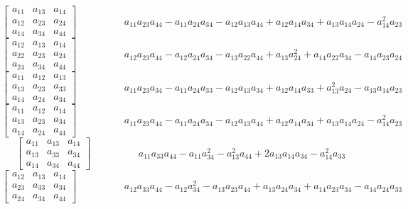 \documentclass[12pt]{article}
\begin{document}
$$\left[\begin{matrix}a_{11} & a_{13} & a_{14}\\a_{12} & a_{23} & a_{24}\\a_{14} & a_{34} & a_{44}\end{matrix}\right]\hspace{2cm} a_{11} a_{23} a_{44} - a_{11} a_{24} a_{34} - a_{12} a_{13} a_{44} + a_{12} a_{14} a_{34} + a_{13} a_{14} a_{24} - a_{14}^{2} a_{23}$$   
$$\left[\begin{matrix}a_{12} & a_{13} & a_{14}\\a_{22} & a_{23} & a_{24}\\a_{24} & a_{34} & a_{44}\end{matrix}\right]\hspace{2cm} a_{12} a_{23} a_{44} - a_{12} a_{24} a_{34} - a_{13} a_{22} a_{44} + a_{13} a_{24}^{2} + a_{14} a_{22} a_{34} - a_{14} a_{23} a_{24}$$   
$$\left[\begin{matrix}a_{11} & a_{12} & a_{13}\\a_{13} & a_{23} & a_{33}\\a_{14} & a_{24} & a_{34}\end{matrix}\right]\hspace{2cm} a_{11} a_{23} a_{34} - a_{11} a_{24} a_{33} - a_{12} a_{13} a_{34} + a_{12} a_{14} a_{33} + a_{13}^{2} a_{24} - a_{13} a_{14} a_{23}$$   
$$\left[\begin{matrix}a_{11} & a_{12} & a_{14}\\a_{13} & a_{23} & a_{34}\\a_{14} & a_{24} & a_{44}\end{matrix}\right]\hspace{2cm} a_{11} a_{23} a_{44} - a_{11} a_{24} a_{34} - a_{12} a_{13} a_{44} + a_{12} a_{14} a_{34} + a_{13} a_{14} a_{24} - a_{14}^{2} a_{23}$$   
$$\left[\begin{matrix}a_{11} & a_{13} & a_{14}\\a_{13} & a_{33} & a_{34}\\a_{14} & a_{34} & a_{44}\end{matrix}\right]\hspace{2cm} a_{11} a_{33} a_{44} - a_{11} a_{34}^{2} - a_{13}^{2} a_{44} + 2 a_{13} a_{14} a_{34} - a_{14}^{2} a_{33}$$   
$$\left[\begin{matrix}a_{12} & a_{13} & a_{14}\\a_{23} & a_{33} & a_{34}\\a_{24} & a_{34} & a_{44}\end{matrix}\right]\hspace{2cm} a_{12} a_{33} a_{44} - a_{12} a_{34}^{2} - a_{13} a_{23} a_{44} + a_{13} a_{24} a_{34} + a_{14} a_{23} a_{34} - a_{14} a_{24} a_{33}$$   
\end{document}
